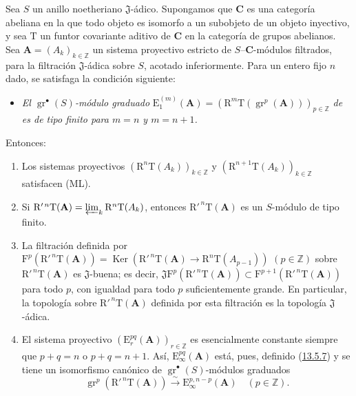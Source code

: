 \begin{proposition}[13.7.7]
\label{0.13.7.7}
\label{0.13.7.7-fr}
Sea $S$ un anillo noetheriano $\mathfrak J$-ádico.
Supongamos que $\boldsymbol{C}$ es una categoría abeliana en la que todo objeto
es isomorfo a un subobjeto de un objeto inyectivo, y sea
$\mathrm T$ un funtor covariante aditivo de $\boldsymbol{C}$ en la
categoría de grupos abelianos.
Sea $\mathbf A=(A_k)_{k\in\mathbb Z}$ un
sistema proyectivo estricto de $S$--$\boldsymbol{C}$-módulos filtrados, para la
filtración $\mathfrak J$-ádica sobre $S$, acotado inferiormente.
Para un entero fijo $n$ dado, se satisfaga la condición siguiente:
\begin{itemize}
\item[$(\mathrm F_n)$]
  \emph{El $\operatorname{gr}^\bullet(S)$-módulo graduado}
  $\mathrm E_1^{(m)}(\mathbf A)=
(\mathrm R^m\mathrm T(\operatorname{gr}^p(\mathbf A)))_{p\in\mathbb Z}$
  \emph{de  es de tipo finito para
  $m=n$ y $m=n+1$.}
\end{itemize}
Entonces:
\begin{enumerate}
  \item[{\rm(i)}] Los sistemas proyectivos
  $(\mathrm R^n\mathrm T(A_k))_{k\in\mathbb Z}$ y
  $(\mathrm R^{n+1}\mathrm T(A_k))_{k\in\mathbb Z}$ satisfacen {\rm(ML)}.
  \item[{\rm(ii)}] Si
  $\mathrm R'^{\,n}\mathrm T(\mathbf A)=
\varprojlim_k\mathrm R^n\mathrm T(A_k)$,
  entonces $\mathrm R'^{\,n}\mathrm T(\mathbf A)$ es un $S$-módulo de tipo finito.
\item[\rm(iii)] La filtración definida por $\mathrm F^p(\mathrm R'^{\,n}\mathrm T(\mathbf A))=
\operatorname{Ker}(\mathrm R'^{\,n}\mathrm T(\mathbf A)
\to\mathrm R^n\mathrm T(A_{p-1}))$ $(p\in\mathbb Z)$ sobre $\mathrm R'^{\,n}\mathrm T(\mathbf A)$ es $\mathfrak J$-buena; es decir,
  $\mathfrak J\mathrm F^p(\mathrm R'^{\,n}\mathrm T(\mathbf A))
\subset\mathrm F^{p+1}(\mathrm R'^{\,n}\mathrm T(\mathbf A))$
  para todo $p$, con igualdad para todo $p$ suficientemente grande.
  En particular, la topología sobre
  $\mathrm R'^{\,n}\mathrm T(\mathbf A)$ definida por esta filtración es la
  topología $\mathfrak J$-ádica.
  \item[{\rm(iv)}] El sistema proyectivo
  $(\mathrm E_r^{pq}(\mathbf A))_{r\in\mathbb Z}$ es esencialmente constante siempre que
  $p+q=n$ o $p+q=n+1$.
  Así, $\mathrm E_\infty^{pq}(\mathbf A)$ está, pues, definido \textup{(\hyperref[0.13.5.7-fr]{13.5.7})} y se tiene un isomorfismo canónico de $\operatorname{gr}^\bullet(S)$-módulos graduados
\begin{equation}
\label{0.13.7.7.1-fr}
\tag{13.7.7.1}
\operatorname{gr}^p(\mathrm R'^{\,n}\mathrm T(\mathbf A))
\xrightarrow{\sim}\mathrm E_\infty^{p,n-p}(\mathbf A)
\quad(p\in\mathbb Z).
\end{equation}
\end{enumerate}
\end{proposition}

